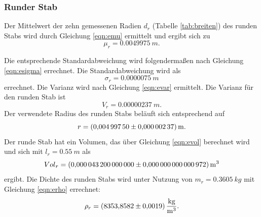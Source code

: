 \subsubsection{Runder Stab}
Der Mittelwert der zehn gemessenen Radien $d_{r}$ (Tabelle \ref{tab:breiten}) des runden Stabs wird durch Gleichung \eqref{eqn:emu} ermittelt und ergibt sich zu
\begin{equation*}
  \mu_{r}=\SI{0.0049975}{m}.
\end{equation*}

Die entsprechende Standardabweichung wird folgendermaßen nach Gleichung \eqref{eqn:esigma} errechnet.
Die Standardabweichung wird als
\begin{equation*}
  \sigma_{r}=\SI{0.0000075}{m}
\end{equation*}
errechnet.
 Die Varianz wird nach Gleichung \eqref{eqn:evar} ermittelt.
 Die Varianz für den runden Stab ist
\begin{equation*}
  V_{r}=\SI{0.00000237}{m}.
\end{equation*}
 Der verwendete Radius des runden Stabs beläuft sich entsprechend auf
\begin{equation*}
  r=\SI{0.0049975 \pm 0.00000237}{m}.
\end{equation*}
 Der runde Stab hat ein Volumen, das über Gleichung \eqref{eqn:evol} berechnet wird
 und sich mit $l_{r}=\SI{0.55}{m}$ als
\begin{equation*}
  {Vol}_{r}= \SI{0.0000432 \pm 0.000000000000972}{m^3}
\end{equation*}
 ergibt.
 Die Dichte des runden Stabs wird unter Nutzung von $m_{r}=\SI{0.3605}{kg}$ mit Gleichung \eqref{eqn:erho} errechnet:
\begin{equation*}
  \rho_{r}=\SI{8353.8582 \pm 0.0019}{\frac{kg}{m^3}}.
\end{equation*}

